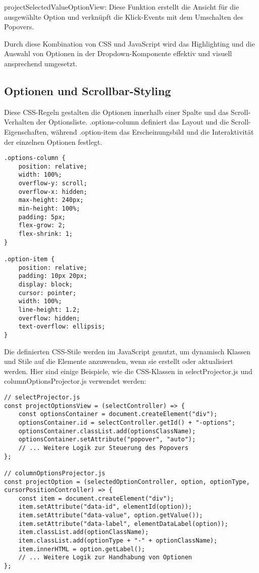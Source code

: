 projectSelectedValueOptionView: Diese Funktion erstellt die Ansicht für die ausgewählte Option und verknüpft die Klick-Events mit dem Umschalten des Popovers.

Durch diese Kombination von CSS und JavaScript wird das Highlighting und die Auswahl von Optionen in der Dropdown-Komponente effektiv und visuell ansprechend umgesetzt.


\subsection{Optionen und Scrollbar-Styling}
\label{sec:sizeLayoutChanges}

Diese CSS-Regeln gestalten die Optionen innerhalb einer Spalte und das Scroll-Verhalten der Optionsliste. .options-column definiert das Layout und die Scroll-Eigenschaften,
während .option-item das Erscheinungsbild und die Interaktivität der einzelnen Optionen festlegt.

\begin{lstlisting}[style = htmlcssjs, caption = Optionen und Scrollbar-Styling]
.options-column {
    position: relative;
    width: 100%;
    overflow-y: scroll;
    overflow-x: hidden;
    max-height: 240px;
    min-height: 100%;
    padding: 5px;
    flex-grow: 2;
    flex-shrink: 1;
}

.option-item {
    position: relative;
    padding: 10px 20px;
    display: block;
    cursor: pointer;
    width: 100%;
    line-height: 1.2;
    overflow: hidden;
    text-overflow: ellipsis;
}
\end{lstlisting}

Die definierten CSS-Stile werden im JavaScript genutzt, um dynamisch Klassen und Stile auf die Elemente anzuwenden, wenn sie erstellt oder aktualisiert werden.
Hier sind einige Beispiele, wie die CSS-Klassen in selectProjector.js und columnOptionsProjector.js verwendet werden:

\begin{lstlisting}[style = htmlcssjs, caption = CSS-Stile im JavaScript]
// selectProjector.js
const projectOptionsView = (selectController) => {
    const optionsContainer = document.createElement("div");
    optionsContainer.id = selectController.getId() + "-options";
    optionsContainer.classList.add(optionsClassName);
    optionsContainer.setAttribute("popover", "auto");
    // ... Weitere Logik zur Steuerung des Popovers
};

// columnOptionsProjector.js
const projectOption = (selectedOptionController, option, optionType, cursorPositionController) => {
    const item = document.createElement("div");
    item.setAttribute("data-id", elementId(option));
    item.setAttribute("data-value", option.getValue());
    item.setAttribute("data-label", elementDataLabel(option));
    item.classList.add(optionClassName);
    item.classList.add(optionType + "-" + optionClassName);
    item.innerHTML = option.getLabel();
    // ... Weitere Logik zur Handhabung von Optionen
};
\end{lstlisting}

